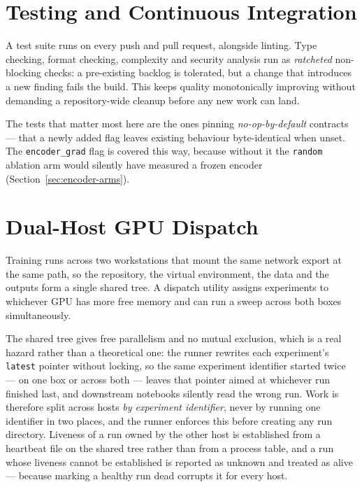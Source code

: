 \section{Testing and Continuous Integration}
\label{sec:ci}

A test suite runs on every push and pull request, alongside linting. Type checking, format
checking, complexity and security analysis run as \emph{ratcheted} non-blocking checks: a
pre-existing backlog is tolerated, but a change that introduces a new finding fails the
build. This keeps quality monotonically improving without demanding a repository-wide
cleanup before any new work can land.

The tests that matter most here are the ones pinning \emph{no-op-by-default} contracts ---
that a newly added flag leaves existing behaviour byte-identical when unset. The
\texttt{encoder\_grad} flag is covered this way, because without it the \texttt{random}
ablation arm would silently have measured a frozen encoder
(Section~\ref{sec:encoder-arms}).

\section{Dual-Host GPU Dispatch}
\label{sec:dispatch}

Training runs across two workstations that mount the same network export at the same path,
so the repository, the virtual environment, the data and the outputs form a single shared
tree. A dispatch utility assigns experiments to whichever GPU has more free memory and can
run a sweep across both boxes simultaneously.

The shared tree gives free parallelism and no mutual exclusion, which is a real hazard
rather than a theoretical one: the runner rewrites each experiment's \texttt{latest} pointer
without locking, so the same experiment identifier started twice --- on one box or across
both --- leaves that pointer aimed at whichever run finished last, and downstream notebooks
silently read the wrong run. Work is therefore split across hosts \emph{by experiment
identifier}, never by running one identifier in two places, and the runner enforces this
before creating any run directory. Liveness of a run owned by the other host is established
from a heartbeat file on the shared tree rather than from a process table, and a run whose
liveness cannot be established is reported as unknown and treated as alive --- because
marking a healthy run dead corrupts it for every host.

